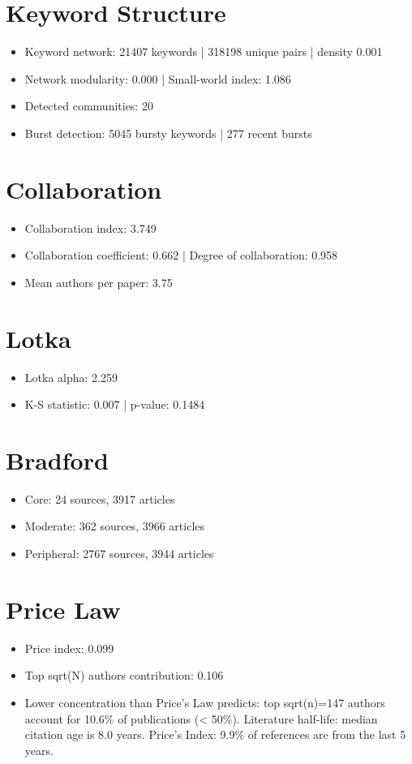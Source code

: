 \documentclass[12pt]{article}
\begin{document}
\section*{Keyword Structure}
\begin{itemize}
\item Keyword network: 21407 keywords | 318198 unique pairs | density 0.001
\item Network modularity: 0.000 | Small-world index: 1.086
\item Detected communities: 20
\item Burst detection: 5045 bursty keywords | 277 recent bursts
\end{itemize}
\section*{Collaboration}
\begin{itemize}
\item Collaboration index: 3.749
\item Collaboration coefficient: 0.662 | Degree of collaboration: 0.958
\item Mean authors per paper: 3.75
\end{itemize}
\section*{Lotka}
\begin{itemize}
\item Lotka alpha: 2.259
\item K-S statistic: 0.007 | p-value: 0.1484
\end{itemize}
\section*{Bradford}
\begin{itemize}
\item Core: 24 sources, 3917 articles
\item Moderate: 362 sources, 3966 articles
\item Peripheral: 2767 sources, 3944 articles
\end{itemize}
\section*{Price Law}
\begin{itemize}
\item Price index: 0.099
\item Top sqrt(N) authors contribution: 0.106
\item Lower concentration than Price's Law predicts: top sqrt(n)=147 authors account for 10.6\% of publications (< 50\%). Literature half-life: median citation age is 8.0 years. Price's Index: 9.9\% of references are from the last 5 years.
\end{itemize}
\end{document}
